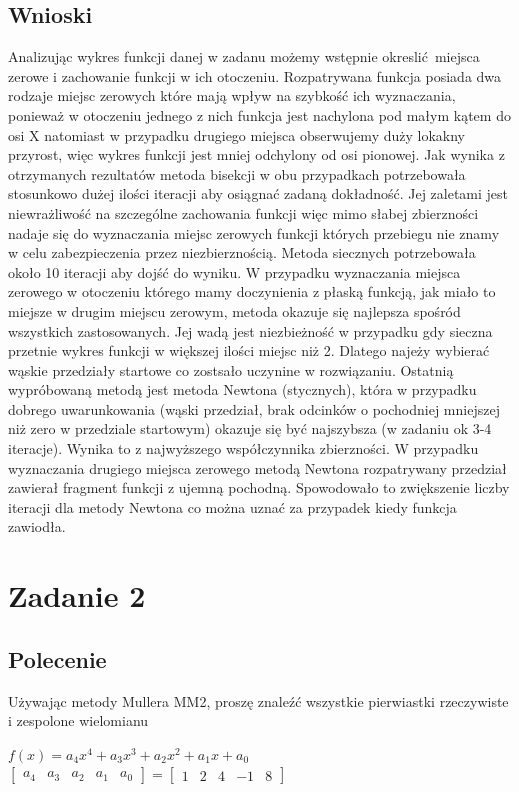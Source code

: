\documentclass[a4paper, 11pt]{article}
\begin{document}
\subsection{Wnioski}
Analizując wykres funkcji danej w zadanu możemy wstępnie okreslić miejsca zerowe i zachowanie funkcji w ich otoczeniu. Rozpatrywana funkcja posiada dwa rodzaje miejsc zerowych które mają wpływ na szybkość ich wyznaczania, ponieważ w otoczeniu jednego z nich funkcja jest nachylona pod małym kątem do osi X natomiast w przypadku drugiego miejsca obserwujemy duży lokakny przyrost, więc wykres funkcji jest mniej odchylony od osi pionowej. Jak wynika z otrzymanych rezultatów metoda bisekcji w obu przypadkach potrzebowała stosunkowo dużej ilości iteracji aby osiągnać zadaną dokładność. Jej zaletami jest niewrażliwość na szczególne zachowania funkcji więc mimo słabej zbierzności nadaje się do wyznaczania miejsc zerowych funkcji których przebiegu nie znamy w celu zabezpieczenia przez niezbierznością. Metoda siecznych potrzebowała około 10 iteracji aby dojść do wyniku. W przypadku wyznaczania miejsca zerowego w otoczeniu którego mamy doczynienia z płaską funkcją, jak miało to miejsze w drugim miejscu zerowym, metoda okazuje się najlepsza spośród wszystkich zastosowanych. Jej wadą jest niezbieżność w przypadku gdy sieczna przetnie wykres funkcji w większej ilości miejsc niż 2. Dlatego najeży wybierać wąskie przedziały startowe co zostsało uczynine w rozwiązaniu. Ostatnią wypróbowaną metodą jest metoda Newtona (stycznych), która w przypadku dobrego uwarunkowania (wąski przedział, brak odcinków o pochodniej mniejszej niż zero w przedziale startowym) okazuje się być najszybsza (w zadaniu ok 3-4 iteracje). Wynika to z najwyższego współczynnika zbierzności. W przypadku wyznaczania drugiego miejsca zerowego metodą Newtona rozpatrywany przedział zawierał fragment funkcji z ujemną pochodną. Spowodowało to zwiększenie liczby iteracji dla metody Newtona co można uznać za przypadek kiedy funkcja zawiodła. 


\section{Zadanie 2}

\subsection{Polecenie}
Używając metody Mullera MM2, proszę znaleźć wszystkie pierwiastki rzeczywiste i zespolone wielomianu
\begin{center}
$f(x) = a_{4}x^4+a_{3}x^3+a_{2}x^2+a_{1}x+a_{0}$ 
$
\left[
\begin{array}{ccccc}
       a_{4} & a_{3} & a_{2} & a_{1} & a_{0}
\end{array}
\right]
=
\left[
\begin{array}{ccccc}
       1 & 2 & 4 & -1 & 8
\end{array}
\right]$
\end{center}
\end{document}
